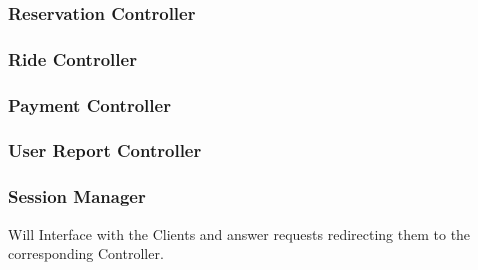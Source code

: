 \documentclass[a4paper]{article}
\begin{document}
\subsubsection{Reservation Controller}
\begin{figure}[h]
\centering
\vspace*{\fill}
\noindent{}%
\vspace*{0.25cm}
\end{figure}
\newpage

\subsubsection{Ride Controller}
\begin{figure}[h]
\centering
\vspace*{\fill}
\noindent{}%
\vspace*{0.25cm}
\end{figure}

\subsubsection{Payment Controller}
\begin{figure}[h]
\centering
\vspace*{\fill}
\noindent{}%
\vspace*{0.25cm}
\end{figure}

\subsubsection{User Report Controller}
\begin{figure}[h]
\centering
\vspace*{\fill}
\noindent{}%
\vspace*{0.25cm}
\end{figure}

\newpage
\subsubsection{Session Manager}
Will Interface with the Clients and answer requests redirecting them to the corresponding Controller.
\begin{figure}[h]
\centering
\vspace*{\fill}
\noindent{}%
\vspace*{0.25cm}
\end{figure}
\end{document}
